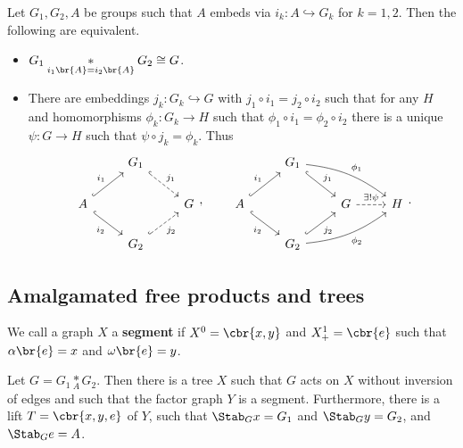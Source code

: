 \begin{fact}
Let $ G_1, G_2, A $ be groups such that $ A $ embeds via $ i_k : A \hookrightarrow G_k $ for $ k = 1, 2 $. Then the following are equivalent.
\begin{itemize}
\item $ G_1 \underset{i_1\br{A} = i_2\br{A}}{*} G_2 \cong G $.
\item There are embeddings $ j_k : G_k \hookrightarrow G $ with $ j_1 \circ i_1 = j_2 \circ i_2 $ such that for any $ H $ and homomorphisms $ \phi_k : G_k \to H $ such that $ \phi_1 \circ i_1 = \phi_2 \circ i_2 $ there is a unique $ \psi : G \to H $ such that $ \psi \circ j_k = \phi_k $. Thus
$$
\begin{tikzcd}
& G_1 \arrow[dashed, hookrightarrow]{dr}{j_1} & \\
A \arrow[hookrightarrow]{ur}{i_1} \arrow[hookrightarrow]{dr}[swap]{i_2} & & G \\
& G_2 \arrow[dashed, hookrightarrow]{ur}[swap]{j_2} &
\end{tikzcd},
\qquad
\begin{tikzcd}
& G_1 \arrow[hookrightarrow]{dr}{j_1} \arrow[bend left=15]{drr}{\phi_1} & & \\
A \arrow[hookrightarrow]{ur}{i_1} \arrow[hookrightarrow]{dr}[swap]{i_2} & & G \arrow[dashed]{r}{\exists !\psi} & H \\
& G_2 \arrow[hookrightarrow]{ur}[swap]{j_2} \arrow[bend right=15]{urr}[swap]{\phi_2} & &
\end{tikzcd}.
$$
\end{itemize}
\end{fact}

\subsection{Amalgamated free products and trees}

\begin{definition}
We call a graph $ X $ a \textbf{segment} if $ X^0 = \cbr{x, y} $ and $ X_+^1 = \cbr{e} $ such that $ \alpha\br{e} = x $ and $ \omega\br{e} = y $.
\end{definition}

\begin{theorem}
\label{thm:2.3.2}
Let $ G = G_1 \underset{A}{*} G_2 $. Then there is a tree $ X $ such that $ G $ acts on $ X $ without inversion of edges and such that the factor graph $ Y $ is a segment. Furthermore, there is a lift $ T = \cbr{x, y, e} $ of $ Y $, such that $ \Stab_G x = G_1 $ and $ \Stab_G y = G_2 $, and $ \Stab_G e = A $.
\end{theorem}

